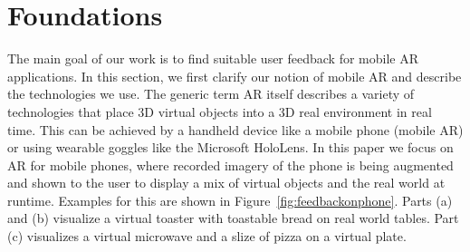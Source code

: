 \documentclass[manuscript]{acmart}
\begin{document}
	\pagestyle{myheadings}
	\section{Foundations}\label{sec:foundations}
		The main goal of our work is to find suitable user feedback for mobile \ac{AR} applications. In this section, we first clarify our notion of mobile \ac{AR} and describe the technologies we use. The generic term \ac{AR} itself describes a variety of technologies that place 3D virtual objects into a 3D real environment in real time. This can be achieved by a handheld device like a mobile phone (mobile \ac{AR}) or using wearable goggles like the Microsoft HoloLens. In this paper we focus on \ac{AR} for mobile phones, where recorded imagery of the phone is being augmented and shown to the user to display a mix of virtual objects and the real world at runtime. Examples for this are shown in Figure~\ref{fig:feedbackonphone}. Parts (a) and (b) visualize a virtual toaster with toastable bread on real world tables. Part (c) visualizes a virtual microwave and a slize of pizza on a virtual plate.
\end{document}
